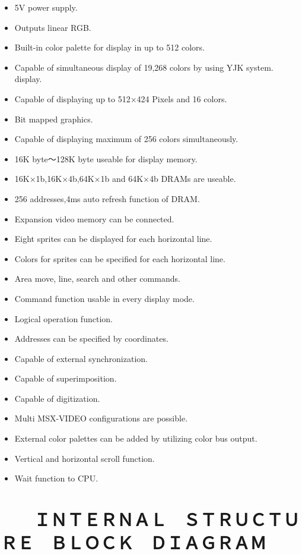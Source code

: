 \documentclass[a4paper,10pt]{article}
\begin{document}
\renewcommand{\labelitemi}{・}
\begin{itemize}[leftmargin=1em, labelsep=0em, itemsep=-0.32em]
\item 5V power supply.
\item Outputs linear RGB.
\item Built-in color palette for display in up to 512 colors.
\item Capable of simultaneous display of 19,268 colors by using YJK system.\\
display.
\item Capable of displaying up to 512×424 Pixels and 16 colors.
\item Bit mapped graphics.
\item Capable of displaying maximum of 256 colors simultaneously.
\item 16K byte～128K byte useable for display memory.
\item 16K×1b,16K×4b,64K×1b and 64K×4b DRAMs are useable.
\item 256 addresses,4ms auto refresh function of DRAM.
\item Expansion video memory can be connected.
\item Eight sprites can be displayed for each horizontal line.
\item Colors for sprites can be specified for each horizontal line.
\item Area move, line, search and other commands.
\item Command function usable in every display mode.
\item Logical operation function.
\item Addresses can be specified by coordinates.
\item Capable of external synchronization.
\item Capable of superimposition.
\item Capable of digitization.
\item Multi MSX-VIDEO configurations are possible.
\item External color palettes can be added by utilizing color bus output.
\item Vertical and horizontal scroll function.
\item Wait function to CPU.
\end{itemize}

\newpage

\section*{　　ＩＮＴＥＲＮＡＬ　ＳＴＲＵＣＴＵＲＥ　ＢＬＯＣＫ　ＤＩＡＧＲＡＭ}
\end{document}
